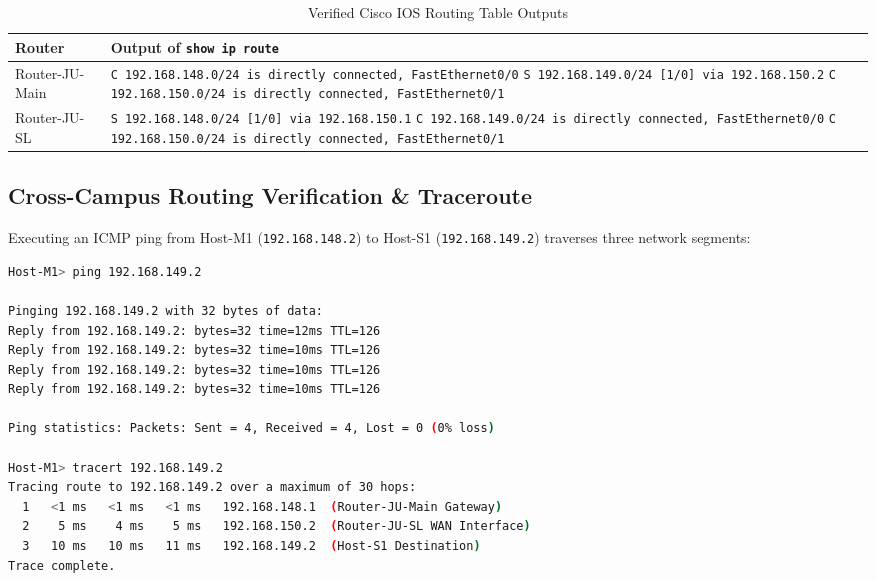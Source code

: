 \documentclass[12pt, a4paper]{article}
\begin{document}
\begin{table}[H]
\centering
\caption{Verified Cisco IOS Routing Table Outputs}
\label{tab:prob5_routes}
\begin{tabularx}{\textwidth}{lX}
\toprule
\textbf{Router} & \textbf{Output of \texttt{show ip route}} \\
\midrule
Router-JU-Main & \texttt{C 192.168.148.0/24 is directly connected, FastEthernet0/0} \newline
                 \texttt{S 192.168.149.0/24 [1/0] via 192.168.150.2} \newline
                 \texttt{C 192.168.150.0/24 is directly connected, FastEthernet0/1} \\
\midrule
Router-JU-SL   & \texttt{S 192.168.148.0/24 [1/0] via 192.168.150.1} \newline
                 \texttt{C 192.168.149.0/24 is directly connected, FastEthernet0/0} \newline
                 \texttt{C 192.168.150.0/24 is directly connected, FastEthernet0/1} \\
\bottomrule
\end{tabularx}
\end{table}

\subsection{Cross-Campus Routing Verification \& Traceroute}
Executing an ICMP ping from Host-M1 (\texttt{192.168.148.2}) to Host-S1 (\texttt{192.168.149.2}) traverses three network segments:
\begin{lstlisting}[language=bash, caption={Problem 5 Ping and Traceroute Output}]
Host-M1> ping 192.168.149.2

Pinging 192.168.149.2 with 32 bytes of data:
Reply from 192.168.149.2: bytes=32 time=12ms TTL=126
Reply from 192.168.149.2: bytes=32 time=10ms TTL=126
Reply from 192.168.149.2: bytes=32 time=10ms TTL=126
Reply from 192.168.149.2: bytes=32 time=10ms TTL=126

Ping statistics: Packets: Sent = 4, Received = 4, Lost = 0 (0% loss)

Host-M1> tracert 192.168.149.2
Tracing route to 192.168.149.2 over a maximum of 30 hops:
  1   <1 ms   <1 ms   <1 ms   192.168.148.1  (Router-JU-Main Gateway)
  2    5 ms    4 ms    5 ms   192.168.150.2  (Router-JU-SL WAN Interface)
  3   10 ms   10 ms   11 ms   192.168.149.2  (Host-S1 Destination)
Trace complete.
\end{lstlisting}
\end{document}
